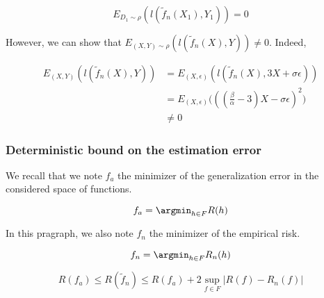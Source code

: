 \documentclass[
10pt, %
a4paper, %
oneside, %
headinclude,footinclude, %
BCOR5mm, %
]{scrartcl}
\begin{document}
    \begin{equation}
	E_{D_1\sim \rho}(l( \tilde{f}_n(X_1), Y_1))=0
    \end{equation}

    However, we can show that $E_{(X,Y)\sim \rho}(l( \tilde{f}_n(X), Y))\neq 0$. Indeed,

    \begin{equation*}
        \begin{aligned}
            \label{eq:}
	    E_{(X,Y)}(l( \tilde{f}_n(X), Y))&=E_{(X,\epsilon)}(l( \tilde{f}_n(X), 3X+\sigma\epsilon))\\
            &=E_{(X,\epsilon)}\big(( (\frac{\beta}{\alpha} - 3)X-\sigma\epsilon)^2\big)\\
            &\neq 0
        \end{aligned}
    \end{equation*}


    \subsubsection{\large\color{Periwinkle}Deterministic bound on the estimation error}

We recall that we note $f_a$ the minimizer of the generalization error in the
considered space of functions.

    \begin{equation}
        f_a = \argmin_{h\in F}R(h)
    \end{equation}

    In this pragraph, we also note $f_n$ the minimizer of the empirical risk.

    \begin{equation}
        f_n = \argmin_{h\in F}R_n(h)
    \end{equation}

    \begin{proposition}
	\label{prop:dilemma}
	\begin{equation}
	    R(f_a)\leq R( \tilde{f}_n)\leq R(f_a)+2 \sup_{f\in F}|R(f)- R_n(f)|
	\end{equation}
    \end{proposition}
\end{document}
